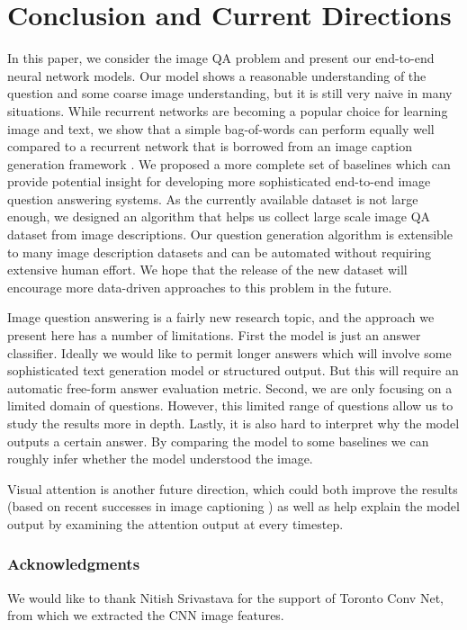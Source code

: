 \documentclass{article} %
\renewcommand{\#}[1]{\textbf{#1}}
\begin{document}
\section{Conclusion and Current Directions}

In this paper, we consider the image QA problem and present our  end-to-end
neural network models. Our model shows a reasonable  understanding of the
question and some coarse image understanding,  but it is still very naive in
many situations.  While recurrent networks are becoming a popular choice for
learning  image and text, we show that a simple bag-of-words can  perform
equally well compared to a recurrent network that  is borrowed from an image
caption generation framework \cite{vinyals14}.  We proposed a more complete set
of baselines which can  provide potential insight  for developing more
sophisticated  end-to-end image question answering systems. As the currently
available dataset is not large enough,  we designed an algorithm that helps us
collect large scale image  QA dataset from image descriptions. Our question
generation algorithm is extensible to many image description datasets  and can
be automated without requiring extensive human effort. We  hope that the
release of the new dataset will encourage more  data-driven approaches to this
problem in the future.

Image question answering is a fairly new research topic, and the approach we
present here has a number of limitations. First the model is just an answer
classifier. Ideally we would like to permit longer answers which will involve
some sophisticated text generation model or structured output. But  this will
require an automatic free-form answer evaluation metric. Second, we are  only
focusing on a limited domain of questions. However, this limited range of
questions allow us to study the results more in depth. Lastly, it is also hard
to  interpret why the model outputs a certain answer. By comparing the model to
some baselines we can roughly infer whether  the model understood the image.

Visual attention is another future direction, which could both  improve the
results (based on recent successes in image captioning \cite{xu15})  as well as
help explain the model output by examining the attention output at every
timestep.

\subsubsection*{Acknowledgments}

We would like to thank Nitish Srivastava for the support of Toronto Conv Net,
from which we extracted the CNN image features.

\begin{small}


\end{small}
\end{document}
